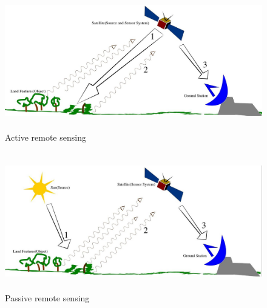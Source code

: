 \documentclass[document.tex]{subfiles}
\begin{document}
\begin{figure}[H]
	\begin{center}
		\includegraphics[height=6.0cm]{imgs/Active.png}
	\end{center}
	\caption{Active remote sensing\cite{32}}
	\label{fig: Active remote sensing}
\end{figure}

\begin{figure}[H]
	\begin{center}
		\includegraphics[height=6.0cm]{imgs/Passive.png}
	\end{center}
	\caption{Passive remote sensing\cite{32}}
	\label{fig: Passive remote sensing}
\end{figure}
\end{document}
